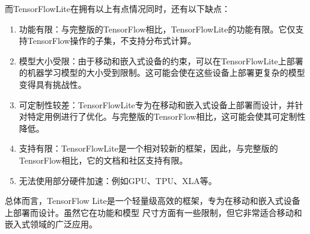 而TensorFlow\hspace{0.5em}Lite在拥有以上有点情况同时，还有以下缺点：
\begin{enumerate}
    \item 功能有限：与完整版的TensorFlow相比，TensorFlow\hspace{0.5em}Lite的功能有限。它仅支持TensorFlow操作的子集，不支持分布式计算。
    \item 模型大小受限：由于移动和嵌入式设备的约束，可以在TensorFlow\hspace{0.5em}Lite上部署的机器学习模型的大小受到限制。这可能会使在这些设备上部署更复杂的模型变得具有挑战性。
    \item 可定制性较差：TensorFlow\hspace{0.5em}Lite专为在移动和嵌入式设备上部署而设计，并针对特定用例进行了优化。与完整版的TensorFlow相比，这可能会使其可定制性降低。
    \item 支持有限：TensorFlow\hspace{0.5em}Lite是一个相对较新的框架，因此，与完整版的TensorFlow相比，它的文档和社区支持有限。
    \item 无法使用部分硬件加速：例如GPU、TPU、XLA等。
\end{enumerate}
总体而言，TensorFlow Lite是一个轻量级高效的框架，专为在移动和嵌入式设备上部署而设计。虽然它在功能和模型
尺寸方面有一些限制，但它非常适合移动和嵌入式领域的广泛应用。

